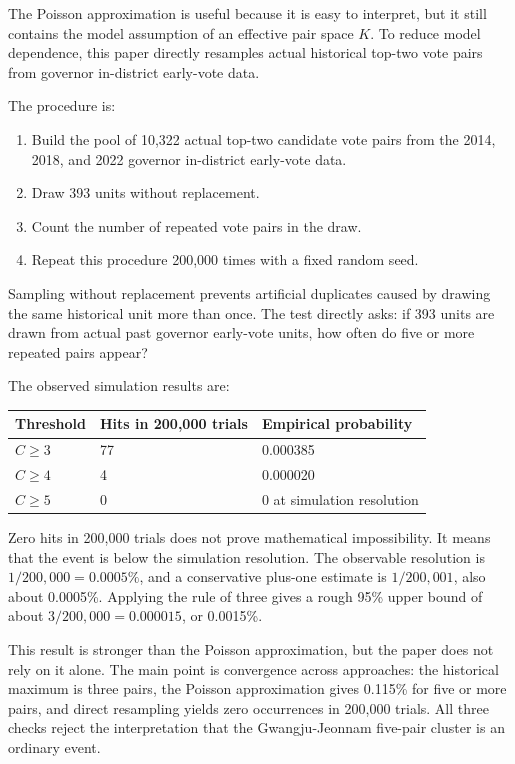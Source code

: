\documentclass[preprint]{../ieie/IEIE}
\begin{document}
The Poisson approximation is useful because it is easy to interpret, but it still contains the model assumption of an effective pair space \(K\). To reduce model dependence, this paper directly resamples actual historical top-two vote pairs from governor in-district early-vote data.

The procedure is:

\begin{enumerate}
\item Build the pool of 10,322 actual top-two candidate vote pairs from the 2014, 2018, and 2022 governor in-district early-vote data.
\item Draw 393 units without replacement.
\item Count the number of repeated vote pairs in the draw.
\item Repeat this procedure 200,000 times with a fixed random seed.
\end{enumerate}

Sampling without replacement prevents artificial duplicates caused by drawing the same historical unit more than once. The test directly asks: if 393 units are drawn from actual past governor early-vote units, how often do five or more repeated pairs appear?

The observed simulation results are:

\begin{center}
\small
\begin{tabular}{l l l}
\toprule
Threshold & Hits in 200,000 trials & Empirical probability \\
\midrule
\(C \geq 3\) & 77 & 0.000385 \\
\(C \geq 4\) & 4 & 0.000020 \\
\(C \geq 5\) & 0 & 0 at simulation resolution \\
\bottomrule
\end{tabular}
\end{center}

Zero hits in 200,000 trials does not prove mathematical impossibility. It means that the event is below the simulation resolution. The observable resolution is \(1/200,000=0.0005\%\), and a conservative plus-one estimate is \(1/200,001\), also about 0.0005\%. Applying the rule of three gives a rough 95\% upper bound of about \(3/200,000 = 0.000015\), or 0.0015\%.

This result is stronger than the Poisson approximation, but the paper does not rely on it alone. The main point is convergence across approaches: the historical maximum is three pairs, the Poisson approximation gives 0.115\% for five or more pairs, and direct resampling yields zero occurrences in 200,000 trials. All three checks reject the interpretation that the Gwangju-Jeonnam five-pair cluster is an ordinary event.
\end{document}
